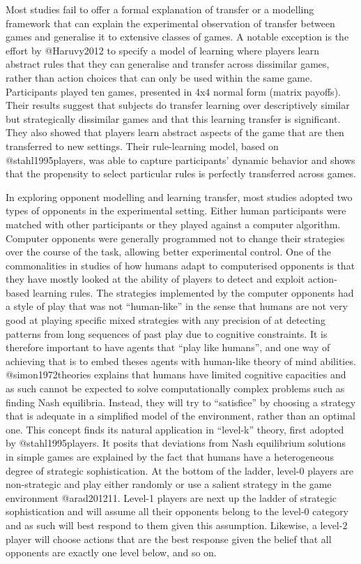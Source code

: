 \documentclass[man,floatsintext]{apa6}
\begin{document}
Most studies fail to offer a formal explanation of transfer or a modelling framework that can explain the experimental observation of transfer between games and generalise it to extensive classes of games. A notable exception is the effort by @Haruvy2012 to specify a model of learning where players learn abstract rules that they can generalise and transfer across dissimilar games, rather than action choices that can only be used within the same game. Participants played ten games, presented in 4x4 normal form (matrix payoffs). Their results suggest that subjects do transfer learning over descriptively similar but strategically dissimilar games and that this learning transfer is significant. They also showed that players learn abstract aspects of the game that are then transferred to new settings. Their rule-learning model, based on @stahl1995players, was able to capture participants' dynamic behavior and shows that the propensity to select particular rules is perfectly transferred across games.

In exploring opponent modelling and learning transfer, most studies adopted two types of opponents in the experimental setting. Either human participants were matched with other participants or they played against a computer algorithm. Computer opponents were generally programmed not to change their strategies over the course of the task, allowing better experimental control. One of the commonalities in studies of how humans adapt to computerised opponents is that they have mostly looked at the ability of players to detect and exploit action-based learning rules. The strategies implemented by the computer opponents had a style of play that was not \enquote{human-like} in the sense that humans are not very good at playing specific mixed strategies with any precision of at detecting patterns from long sequences of past play due to cognitive constraints. It is therefore important to have agents that \enquote{play like humans}, and one way of achieving that is to embed theses agents with human-like theory of mind abilities. @simon1972theories explains that humans have limited cognitive capacities and as such cannot be expected to solve computationally complex problems such as finding Nash equilibria. Instead, they will try to \enquote{satisfice} by choosing a strategy that is adequate in a simplified model of the environment, rather than an optimal one. This concept finds its natural application in \enquote{level-k} theory, first adopted by @stahl1995players. It posits that deviations from Nash equilibrium solutions in simple games are explained by the fact that humans have a heterogeneous degree of strategic sophistication. At the bottom of the ladder, level-0 players are non-strategic and play either randomly or use a salient strategy in the game environment @arad201211. Level-1 players are next up the ladder of strategic sophistication and will assume all their opponents belong to the level-0 category and as such will best respond to them given this assumption. Likewise, a level-2 player will choose actions that are the best response given the belief that all opponents are exactly one level below, and so on.
\end{document}
